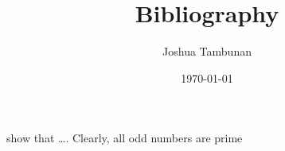 \documentclass[]{article}
\title{Bibliography}
\author{Joshua Tambunan}
\date{\today}
\begin{document}
\maketitle

\citet{Brooks1997Methodology}
show that \ldots. Clearly,
all odd numbers are prime
\citep{Jacobson1999Towards}


%

\end{document}
